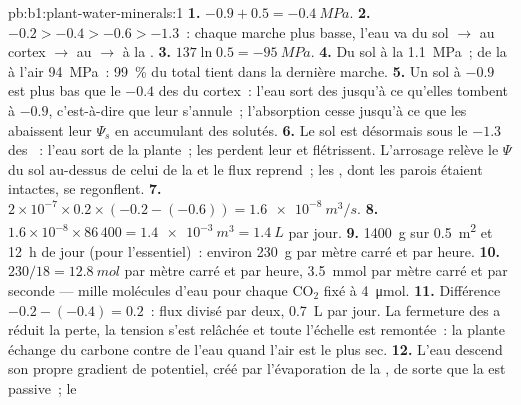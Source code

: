 \begin{solution}{pb:b1:plant-water-minerals:1}
\textbf{1.} $-0.9 + 0.5 = \qty{-0.4}{MPa}$.
\textbf{2.} $-0.2 > -0.4 > -0.6 > -1.3$~: chaque marche plus basse,
l'eau va du sol $\to$ au cortex $\to$ au  $\to$ à la .
\textbf{3.} $137\ln 0.5 = \qty{-95}{MPa}$.
\textbf{4.} Du sol à la  \qty{1.1}{MPa}~; de la  à l'air
\qty{94}{MPa}~: \qty{99}{\%} du total tient dans la dernière marche.
\textbf{5.} Un sol à $-0.9$ est plus bas que le $-0.4$ des  du
cortex~: l'eau sort des  jusqu'à ce qu'elles tombent à $-0.9$,
c'est-à-dire que leur  s'annule~; l'absorption cesse jusqu'à
ce que les  abaissent leur $\Psi_s$ en accumulant des solutés.
\textbf{6.} Le sol est désormais sous le $-1.3$ des ~: l'eau
sort de la plante~; les  perdent leur  et flétrissent.
L'arrosage relève le $\Psi$ du sol au-dessus de celui de la  et
le flux reprend~; les , dont les parois étaient intactes, se
regonflent.
\textbf{7.} $2\times 10^{-7}\times 0.2\times(-0.2 - (-0.6)) =
\qty{1.6e-8}{m^3/s}$.
\textbf{8.} $1.6\times 10^{-8}\times 86\,400 = \qty{1.4e-3}{m^3} =
\qty{1.4}{L}$ par jour.
\textbf{9.} \qty{1400}{g} sur \qty{0.5}{m^2} et \qty{12}{h} de jour
(pour l'essentiel)~: environ \qty{230}{g} par mètre carré et par heure.
\textbf{10.} $230/18 = \qty{12.8}{mol}$ par mètre carré et par heure, \qty{3.5}{mmol} par mètre carré et par seconde --- mille molécules d'eau pour chaque $\mathrm{CO_2}$ fixé à \qty{4}{\micro mol}.
\textbf{11.} Différence $-0.2 - (-0.4) = 0.2$~: flux divisé par deux,
\qty{0.7}{L} par jour. La fermeture des  a réduit la perte, la
tension s'est relâchée et toute l'échelle est remontée~: la plante
échange du carbone contre de l'eau quand l'air est le plus sec.
\textbf{12.} L'eau descend son propre gradient de potentiel, créé par
l'évaporation de la , de sorte que la  est passive~; le

\end{solution}
